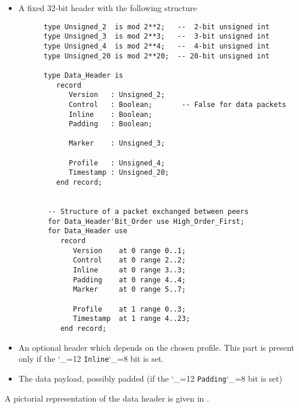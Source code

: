 \documentclass{rfc}
\def\ttt{\catcode`\_=12 \tttii}
\def\tttii#1!{{\tt #1}\catcode`\_=8{}}
\begin{document}
\begin{itemize}
  \item
    A fixed 32-bit header with the following structure

    \begin{verbatim}
      type Unsigned_2  is mod 2**2;   --  2-bit unsigned int
      type Unsigned_3  is mod 2**3;   --  3-bit unsigned int
      type Unsigned_4  is mod 2**4;   --  4-bit unsigned int
      type Unsigned_20 is mod 2**20;  -- 20-bit unsigned int

      type Data_Header is
         record
            Version   : Unsigned_2;
            Control   : Boolean;       -- False for data packets
            Inline    : Boolean;
            Padding   : Boolean;
      
            Marker    : Unsigned_3;
      
            Profile   : Unsigned_4;
            Timestamp : Unsigned_20;
         end record;


       -- Structure of a packet exchanged between peers
       for Data_Header'Bit_Order use High_Order_First;
       for Data_Header use
          record
             Version    at 0 range 0..1;
             Control    at 0 range 2..2;
             Inline     at 0 range 3..3;
             Padding    at 0 range 4..4;
             Marker     at 0 range 5..7;

             Profile    at 1 range 0..3;
             Timestamp  at 1 range 4..23;
          end record;
    \end{verbatim}
  \item
    An optional header which depends on the chosen profile. This part
    is present only if the \ttt Inline! bit is set.
  \item
    The data payload, possibly padded (if the \ttt Padding! bit is set)
\end{itemize}

A pictorial representation of the data header is given in .
\end{document}
